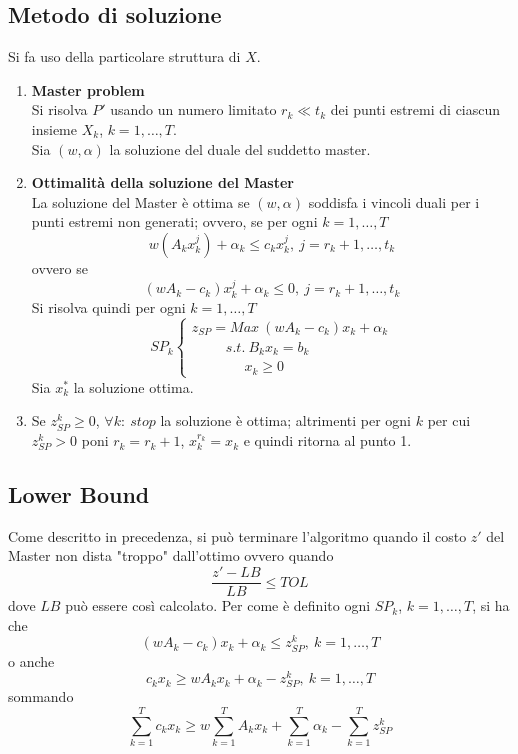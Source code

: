 \subsection{Metodo di soluzione}
Si fa uso della particolare struttura di $X$.
\begin{enumerate}
	\item \textbf{Master problem}\\
	Si risolva $P'$ usando un numero limitato $r_{k}\ll t_{k}$ dei punti estremi di ciascun insieme $X_{k}$, $k=1,\dots,T$.\\
	Sia $(w,\alpha)$ la soluzione del duale del suddetto master.
	\item \textbf{Ottimalità della soluzione del Master}\\
	La soluzione del Master è ottima se $(w,\alpha)$ soddisfa i vincoli duali per i punti estremi non generati; ovvero, se per ogni $k=1,\dots,T$
	\begin{equation*}
		w(A_{k}x_{k}^{j})+\alpha_{k}\le c_{k}x_{k}^{j},\ j=r_{k}+1,\dots,t_{k}
	\end{equation*}
	ovvero se
	\begin{equation*}
			(w A_{k}-c_{k})x_{k}^{j}+\alpha_{k}\le 0,\ j=r_{k}+1,\dots,t_{k}
	\end{equation*}
	Si risolva quindi per ogni $k=1,\dots,T$
	\begin{equation*}
		SP_{k}
		\begin{cases}
			z_{SP}=Max\ (w A_{k}-c_{k})x_{k}+\alpha_{k} \\
			\ \ \ \ \ \ \ \ \ \ \ s.t.\ B_{k}x_{k}=b_{k} \\
			\ \ \ \ \ \ \ \ \ \ \ \ \ \ \ \ \ x_{k}\ge 0
		\end{cases}
	\end{equation*}
	Sia $x_{k}^{*}$ la soluzione ottima.
	\item Se $z_{SP}^{k}\ge 0$, $\forall k:\ stop$ la soluzione è ottima; altrimenti per ogni $k$ per cui $z_{SP}^{k}>0$ poni $r_{k}=r_{k}+1$, $x_{k}^{r_{k}}=x_{k}$ e quindi ritorna al punto 1.
\end{enumerate}

\clearpage
\subsection{Lower Bound}
Come descritto in precedenza, si può terminare l'algoritmo quando il costo $z'$ del Master non dista "troppo" dall'ottimo ovvero quando
\begin{equation*}
	\frac{z'-LB}{LB}\le TOL
\end{equation*}
dove $LB$ può essere così calcolato.
Per come è definito ogni $SP_{k}$, $k=1,\dots,T$, si ha che
\begin{equation*}
	(w A_{k}-c_{k})x_{k}+\alpha_{k}\le z_{SP}^{k},\ k=1,\dots,T
\end{equation*}
o anche
\begin{equation*}
	c_{k}x_{k}\ge w A_{k}x_{k}+\alpha_{k}-z_{SP}^{k},\ k=1,\dots,T
\end{equation*}
sommando
\begin{equation*}
	\sum_{k=1}^{T}c_{k}x_{k}\ge w\sum_{k=1}^{T}A_{k}x_{k}+\sum_{k=1}^{T}\alpha_{k}-\sum_{k=1}^{T}z_{SP}^{k}
\end{equation*}

